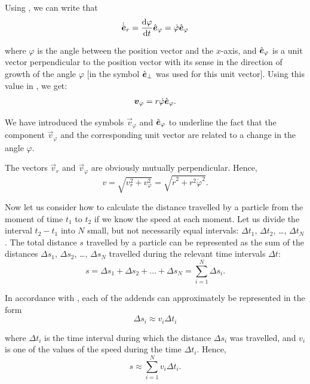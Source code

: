 Using , we can write that
\begin{equation*}
\dot{\hat{\boldsymbol{e}}}_r = \frac{\mathrm{d}\varphi}{\mathrm{d} t}\hat{\boldsymbol{e}}_{\varphi} = \dot{\varphi}\hat{\boldsymbol{e}}_{\varphi}
\end{equation*}

\noindent
where $\varphi$ is the angle between the position vector and the $x$-axis, and $\hat{\boldsymbol{e}}_{\varphi}$ is a unit vector perpendicular to the position vector with its sense in the direction of growth of the angle $\varphi$ [in  the symbol $\hat{\boldsymbol{e}}_{\perp}$ was used for this unit vector]. Using this value in , we get:
\begin{equation}\label{eq:1_71}
\boldsymbol{v}_{\varphi} = r\dot{\varphi}\hat{\boldsymbol{e}}_{\varphi}.
\end{equation}

\noindent
We have introduced the symbols $\vec{v}_{\varphi}$ and $\hat{\boldsymbol{e}}_{\varphi}$ to underline the fact that the component $\vec{v}_{\varphi}$ and the corresponding unit vector are related to a change in the angle $\varphi$.

The vectors $\vec{v}_r$ and $\vec{v}_{\varphi}$ are obviously mutually perpendicular. Hence,
\begin{equation}\label{eq:1_72}
v = \sqrt{v_r^2 + v_{\varphi}^2} = \sqrt{\dot{r}^2 + r^2\dot{\varphi}^2}.
\end{equation}

Now let us consider how to calculate the distance travelled by a particle from the moment of time $t_1$ to $t_2$ if we know the speed at each moment. Let us divide the interval $t_2-t_1$ into $N$ small, but not necessarily equal intervals: $\Delta t_1$, $\Delta t_2$, \ldots, $\Delta t_N$. The total distance $s$ travelled by a particle can be represented as the sum of the distances $\Delta s_1$, $\Delta s_2$, \ldots, $\Delta s_N$ travelled during the relevant time intervals $\Delta t$:
\begin{equation*}
s = \Delta s_1 + \Delta s_2 + \ldots + \Delta s_N = \sum_{i=1}^{N} \Delta s_i.
\end{equation*}

\noindent
In accordance with , each of the addends can approximately be represented in the form
\begin{equation*}
\Delta s_i \approx v_i \Delta t_i
\end{equation*}

\noindent
where $\Delta t_i$ is the time interval during which the distance $\Delta s_i$ was travelled, and $v_i$ is one of the values of the speed during the time $\Delta t_i$. Hence,
\begin{equation}\label{eq:1_73}
s \approx \sum_{i=1}^{N} v_i \Delta t_i.
\end{equation}

